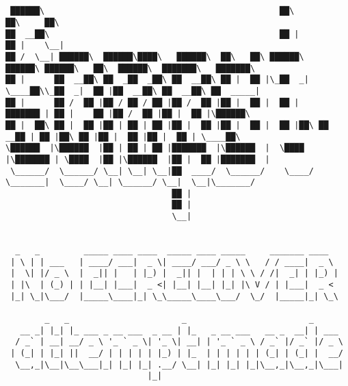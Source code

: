 \documentclass[varwidth=\maxdimen,margin=0.5cm,multi={verbatim}]{standalone}
\begin{document}
\begin{verbatim}


 ██████\                                                ██\                ██\     ██\
██  __██\                                               ██ |               ██ |    \__|
██ /  \__| ██████\  ██████\████\   ██████\  ██\   ██\ ██████\    ██████\ ██████\   ██\  ██████\  ███████\   ███████\
██ |      ██  __██\ ██  _██  _██\ ██  __██\ ██ |  ██ |\_██  _|   \____██\\_██  _|  ██ |██  __██\ ██  __██\ ██  _____|
██ |      ██ /  ██ |██ / ██ / ██ |██ /  ██ |██ |  ██ |  ██ |     ███████ | ██ |    ██ |██ /  ██ |██ |  ██ |\██████\
██ |  ██\ ██ |  ██ |██ | ██ | ██ |██ |  ██ |██ |  ██ |  ██ |██\ ██  __██ | ██ |██\ ██ |██ |  ██ |██ |  ██ | \____██\
\██████  |\██████  |██ | ██ | ██ |███████  |\██████  |  \████  |\███████ | \████  |██ |\██████  |██ |  ██ |███████  |
 \______/  \______/ \__| \__| \__|██  ____/  \______/    \____/  \_______|  \____/ \__| \______/ \__|  \__|\_______/
                                  ██ |
                                  ██ |
                                  \__|


  _   _         _____ ____ ____  _____ ____ _____     _______ ____
 | \ | | ___   | ____/ ___|  _ \| ____/ ___/ _ \ \   / / ____|  _ \
 |  \| |/ _ \  |  _|| |   | |_) |  _|| |  | | | \ \ / /|  _| | |_) |
 | |\  | (_) | | |__| |___|  _ <| |__| |__| |_| |\ V / | |___|  _ <
 |_| \_|\___/  |_____\____|_| \_\_____\____\___/  \_/  |_____|_| \_\

        _   _                       _                         _
   __ _| |_| |_ ___ _ __ ___  _ __ | |_   _ __ ___   __ _  __| | ___
  / _` | __| __/ _ \ '_ ` _ \| '_ \| __| | '_ ` _ \ / _` |/ _` |/ _ \
 | (_| | |_| ||  __/ | | | | | |_) | |_  | | | | | | (_| | (_| |  __/
  \__,_|\__|\__\___|_| |_| |_| .__/ \__| |_| |_| |_|\__,_|\__,_|\___|
                             |_|



\end{verbatim}
\end{document}
